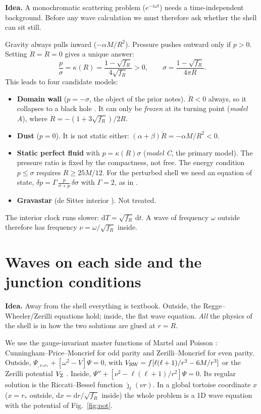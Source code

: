 \documentclass[10pt,a4paper]{article}
\newcommand{\sq}{\sqrt{f_R}}
\newcommand{\dd}{\mathrm{d}}
\newcommand{\idea}[1]{\par\smallskip\noindent\colorbox{idea!8}{\parbox{\dimexpr\linewidth-2\fboxsep}{\small\textbf{\color{idea}Idea.} #1}}\par\smallskip}
\begin{document}
\idea{A monochromatic scattering problem ($e^{-i\omega t}$) needs a time-independent background. Before any wave
calculation we must therefore ask whether the shell can sit still.}

Gravity always pulls inward ($-\alpha M/R^2$). Pressure pushes outward only if $p>0$. Setting $\dot R=\ddot R=0$ gives a unique
answer:
\begin{equation}
\frac{p}{\sigma}=\kappa(R)=\frac{1-\sq}{4\sq}>0,\qquad \sigma=\frac{1-\sq}{4\pi R}.
\label{eq:kappa}
\end{equation}
This leads to four candidate models:
\begin{itemize}
\item \textbf{Domain wall} ($p=-\sigma$, the object of the prior notes). $\ddot R<0$ always, so it collapses to a black
hole \cite{IS84}. It can only be \emph{frozen} at its turning point (\emph{model A}), where $\ddot R=-(1+3\sq)/2R$.
\item \textbf{Dust} ($p=0$). It is not static either: $(\alpha+\beta)\ddot R=-\alpha M/R^2<0$.
\item \textbf{Static perfect fluid} with $p=\kappa(R)\sigma$ (\emph{model C}, the primary model). The pressure ratio
is fixed by the compactness, not free. The energy condition $p\le\sigma$ requires $R\ge25M/12$. For the perturbed shell
we need an equation of state, $\delta p=\Gamma\,\frac{p}{\sigma+p}\,\delta\sigma$ with $\Gamma=2$, as in
\cite{PSP26}.
\item \textbf{Gravastar} (de Sitter interior \cite{Pani09}). Not treated.
\end{itemize}
The interior clock runs slower: $\dd T=\sq\,\dd t$. A wave of frequency $\omega$ outside therefore has frequency
$\nu=\omega/\sq$ inside.

\section{Waves on each side and the junction conditions}
\idea{Away from the shell everything is textbook. Outside, the Regge--Wheeler/Zerilli equations hold; inside, the flat
wave equation. \emph{All} the physics of the shell is in how the two solutions are glued at $r=R$.}

We use the gauge-invariant master functions of Martel and Poisson \cite{MP05}: Cunningham--Price--Moncrief for odd
parity and Zerilli--Moncrief for even parity. Outside,
$\Psi_{,r_*r_*}+[\omega^2-V]\Psi=0$, with $V_{\rm RW}=f[\ell(\ell+1)/r^2-6M/r^3]$ \cite{RW57} or the Zerilli potential
$V_{\rm Z}$ \cite{Zerilli70}. Inside, $\Psi''+[\nu^2-\ell(\ell+1)/r^2]\Psi=0$. Its regular solution is the Riccati--Bessel
function $\hat\jmath_\ell(\nu r)$. In a global tortoise coordinate $x$ ($x=r_*$ outside, $\dd x=\dd r/\sq$ inside) the
whole problem is a 1D wave equation with the potential of Fig.~\ref{fig:pot}.
\end{document}
